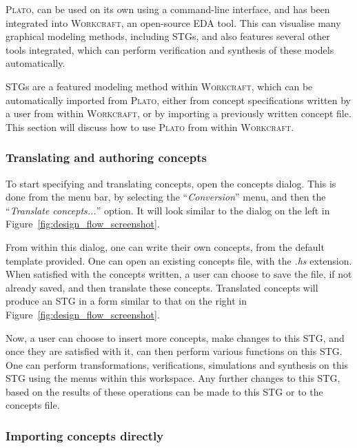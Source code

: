 \documentclass[british,conference,compsoc]{IEEEtran}
\newcommand{\noun}[1]{\textsc{#1}}
\begin{document}
\noun{Plato}, can be used on its own using a command-line interface, and has been
integrated into \noun{Workcraft}, an open-source EDA tool. This can visualise many graphical modeling
methods, including STGs, and also features several other tools integrated, which can perform verification
and synthesis of these models automatically.

STGs are a featured modeling method within \noun{Workcraft},
which can be automatically imported from \noun{Plato}, either from concept specifications written by a user from within 
\noun{Workcraft}, or by importing a previously written concept file. 
This section will discuss how to use \noun{Plato} from within
\noun{Workcraft}.

\vspace{-2mm}
 
\subsubsection{Translating and authoring concepts}

To start specifying and translating concepts, open the concepts dialog.  This is
done from the menu bar, by selecting the ``\emph{Conversion}'' menu, and then
the ``\emph{Translate concepts...}'' option. It will look similar to the dialog 
on the left in Figure~\ref{fig:design_flow_screenshot}.

From within this dialog, one can write their own concepts, from the default 
template provided. One can open an 
existing concepts file, with the \emph{.hs} extension. When satisfied with the 
concepts written, a user can choose to save the file, if not already saved, and
then translate these concepts. Translated concepts will produce an STG in a 
form similar to that on the right in Figure~\ref{fig:design_flow_screenshot}.

Now, a user can choose to insert more 
concepts, make changes to this STG, and once they are satisfied with it, can 
then perform various functions on this STG. One can perform transformations, 
verifications, simulations and synthesis on this STG using the menus within this 
workspace. Any further changes to this STG, based on the results of these 
operations can be made to this STG or to the concepts file. 

\subsubsection{Importing concepts directly}
\end{document}
